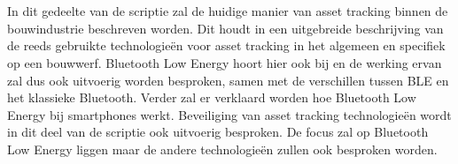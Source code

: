 \chapter{}%
\label{ch:stand-van-zaken}



%
%

In dit gedeelte van de scriptie zal de huidige manier van asset tracking binnen de bouwindustrie beschreven worden. Dit houdt in een uitgebreide beschrijving van de reeds gebruikte technologieën voor asset tracking in het algemeen en specifiek op een bouwwerf. Bluetooth Low Energy hoort hier ook bij en de werking ervan zal dus ook uitvoerig worden besproken, samen met de verschillen tussen BLE en het klassieke Bluetooth. Verder zal er verklaard worden hoe Bluetooth Low Energy bij smartphones werkt. Beveiliging van asset tracking technologieën wordt in dit deel van de scriptie ook uitvoerig besproken. De focus zal op Bluetooth Low Energy liggen maar de andere technologieën zullen ook besproken worden.

